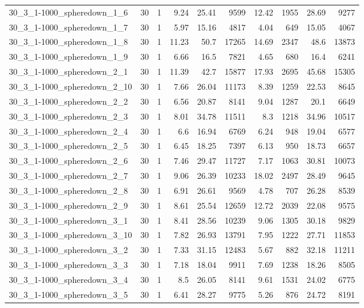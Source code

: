 \begin{center}
\begin{scriptsize}
\begin{longtable}{lrrrrrrrrr}
30\_3\_1-1000\_spheredown\_1\_6 & 30 & 1 & 9.24 & 25.41 & 9599 & 12.42 & 1955 & 28.69 & 9277\\
30\_3\_1-1000\_spheredown\_1\_7 & 30 & 1 & 5.97 & 15.16 & 4817 & 4.04 & 649 & 15.05 & 4067\\
30\_3\_1-1000\_spheredown\_1\_8 & 30 & 1 & 11.23 & 50.7 & 17265 & 14.69 & 2347 & 48.6 & 13873\\
30\_3\_1-1000\_spheredown\_1\_9 & 30 & 1 & 6.66 & 16.5 & 7821 & 4.65 & 680 & 16.4 & 6241\\
30\_3\_1-1000\_spheredown\_2\_1 & 30 & 1 & 11.39 & 42.7 & 15877 & 17.93 & 2695 & 45.68 & 15305\\
30\_3\_1-1000\_spheredown\_2\_10 & 30 & 1 & 7.66 & 26.04 & 11173 & 8.39 & 1259 & 22.53 & 8645\\
30\_3\_1-1000\_spheredown\_2\_2 & 30 & 1 & 6.56 & 20.87 & 8141 & 9.04 & 1287 & 20.1 & 6649\\
30\_3\_1-1000\_spheredown\_2\_3 & 30 & 1 & 8.01 & 34.78 & 11511 & 8.3 & 1218 & 34.96 & 10517\\
30\_3\_1-1000\_spheredown\_2\_4 & 30 & 1 & 6.6 & 16.94 & 6769 & 6.24 & 948 & 19.04 & 6577\\
30\_3\_1-1000\_spheredown\_2\_5 & 30 & 1 & 6.45 & 18.25 & 7397 & 6.13 & 950 & 18.73 & 6657\\
30\_3\_1-1000\_spheredown\_2\_6 & 30 & 1 & 7.46 & 29.47 & 11727 & 7.17 & 1063 & 30.81 & 10073\\
30\_3\_1-1000\_spheredown\_2\_7 & 30 & 1 & 9.06 & 26.39 & 10233 & 18.02 & 2497 & 28.49 & 9645\\
30\_3\_1-1000\_spheredown\_2\_8 & 30 & 1 & 6.91 & 26.61 & 9569 & 4.78 & 707 & 26.28 & 8539\\
30\_3\_1-1000\_spheredown\_2\_9 & 30 & 1 & 8.61 & 25.54 & 12659 & 12.72 & 2039 & 22.08 & 9575\\
30\_3\_1-1000\_spheredown\_3\_1 & 30 & 1 & 8.41 & 28.56 & 10239 & 9.06 & 1305 & 30.18 & 9829\\
30\_3\_1-1000\_spheredown\_3\_10 & 30 & 1 & 7.82 & 26.93 & 13791 & 7.95 & 1222 & 27.71 & 11853\\
30\_3\_1-1000\_spheredown\_3\_2 & 30 & 1 & 7.33 & 31.15 & 12483 & 5.67 & 882 & 32.18 & 11211\\
30\_3\_1-1000\_spheredown\_3\_3 & 30 & 1 & 7.18 & 18.04 & 9911 & 7.69 & 1238 & 18.26 & 8505\\
30\_3\_1-1000\_spheredown\_3\_4 & 30 & 1 & 8.5 & 26.05 & 8141 & 9.61 & 1531 & 24.02 & 6775\\
30\_3\_1-1000\_spheredown\_3\_5 & 30 & 1 & 6.41 & 28.27 & 9775 & 5.26 & 876 & 24.72 & 8191\\

\end{longtable}
\end{scriptsize}
\end{center}
